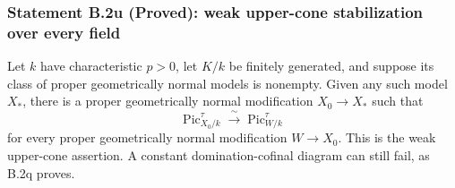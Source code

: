 \subsubsection*{Statement B.2u (Proved): weak upper-cone stabilization over every field}
\begin{theorem}
\label{B:B2-arbitrary-field-stabilization}
Let $k$ have characteristic $p>0$, let $K/k$ be finitely generated,
and suppose its class of proper geometrically normal models is
nonempty.  Given any such model $X_*$, there is a proper
geometrically normal modification $X_0\to X_*$ such that
\[
 \operatorname{Pic}^{\tau}_{X_0/k}\xrightarrow{\ \sim\ }
 \operatorname{Pic}^{\tau}_{W/k}
\]
for every proper geometrically normal modification $W\to X_0$.
This is the weak upper-cone assertion.  A constant domination-cofinal
diagram can still fail, as B.2q proves.
\end{theorem}

